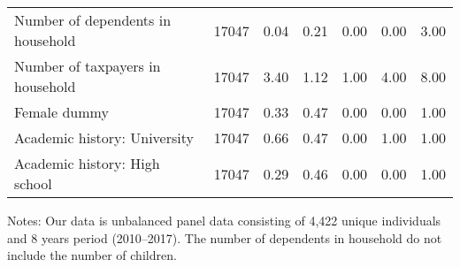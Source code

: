 \begin{table}
\begin{threeparttable}
\begin{tabular}[t]{lcccccc}
\hspace{1em}Number of dependents in household & 17047 & \num{0.04} & \num{0.21} & \num{0.00} & \num{0.00} & \num{3.00}\\
\hspace{1em}Number of taxpayers in household & 17047 & \num{3.40} & \num{1.12} & \num{1.00} & \num{4.00} & \num{8.00}\\
\hspace{1em}Female dummy & 17047 & \num{0.33} & \num{0.47} & \num{0.00} & \num{0.00} & \num{1.00}\\
\hspace{1em}Academic history: University & 17047 & \num{0.66} & \num{0.47} & \num{0.00} & \num{1.00} & \num{1.00}\\
Academic history: High school & 17047 & \num{0.29} & \num{0.46} & \num{0.00} & \num{0.00} & \num{1.00}\\
\bottomrule
\end{tabular}
\begin{tablenotes}
\item Notes: Our data is unbalanced panel data consisting of 4,422 unique individuals and 8 years period (2010--2017). The number of dependents in household do not include the number of children.
\end{tablenotes}
\end{threeparttable}
\end{table}
